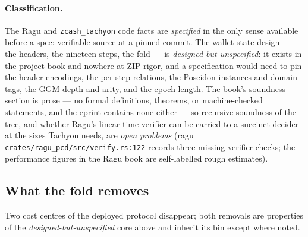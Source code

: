 \documentclass[11pt,a4paper]{article}
\theoremstyle{definition}
\begin{document}
\paragraph{Classification.} The Ragu and \texttt{zcash\_tachyon} code facts
are \emph{specified} in the only sense available before a spec: verifiable
source at a pinned commit. The wallet-state design --- the headers, the
nineteen steps, the fold --- is \emph{designed but unspecified}: it exists in
the project book and nowhere at ZIP rigor, and a specification would need to
pin the header encodings, the per-step relations, the Poseidon instances and
domain tags, the GGM depth and arity, and the epoch length. The book's
soundness section is prose --- no formal definitions, theorems, or
machine-checked statements, and the eprint contains none either --- so
recursive soundness of the tree, and whether Ragu's linear-time verifier can
be carried to a succinct decider at the sizes Tachyon needs, are \emph{open
problems} (ragu \texttt{crates/ragu\_pcd/src/verify.rs:122} records three
missing verifier checks; the performance figures in the Ragu book are
self-labelled rough estimates).

\subsection{What the fold removes}\label{sec:tachyon-removes}

Two cost centres of the deployed protocol disappear; both removals are
properties of the \emph{designed-but-unspecified} core above and inherit its
bin except where noted.
\end{document}
